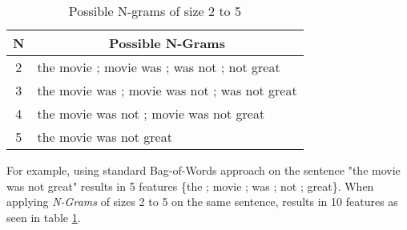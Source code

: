 			\begin{table}[h]	
				\begin{center}
					\begin{tabular}{c l} 
						\hline\hline
						N &  \multicolumn{1}{c}{Possible N-Grams }  \\ 
						\hline
						2 & the movie ; movie was ; was not ; not great  \\
						3 & the movie was ; movie was not ; was not great \\
						4 & the movie was not ; movie was not great \\
						5 & the movie was not great \\ 
						\hline\hline
					\end{tabular}
				\end{center}
				\caption[N-Gram Example]{Possible N-grams of size 2 to 5 }
				\label{table:ngrams}
			\end{table}
			
			For example, using standard Bag-of-Words approach on the sentence "the movie was not great" results in 5 features \{the ; movie ; was ; not ; great\}. When applying \textit{N-Grams} of sizes 2 to 5 on the same sentence, results in 10 features as seen in table \ref{table:ngrams}.
			
